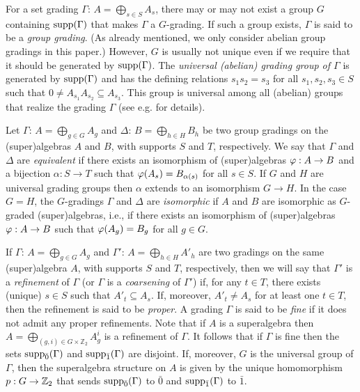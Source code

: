 For a set grading $\Gamma:\,A=\bigoplus_{s\in S}A_s$, there may or may not exist a group $G$ containing $\operatorname{supp}(\Gamma)$ that makes $\Gamma$ a $G$-grading. 
If such a group exists, $\Gamma$ is said to be a {\em group grading}. (As already mentioned, we only consider abelian group gradings in this paper.) 
However, $G$ is usually not unique even if we require that it should be generated by $\operatorname{supp}(\Gamma)$. 
The {\em universal (abelian) grading group of $\Gamma$} \cite{PZ} is generated by $\operatorname{supp}(\Gamma)$ and has the defining relations 
$s_1s_2=s_3$ for all $s_1,s_2,s_3\in S$ such that $0\neq A_{s_1}A_{s_2}\subseteq A_{s_3}$. 
This group is universal among all (abelian) groups that realize the grading $\Gamma$ (see e.g. \cite[Chapter 1]{livromicha} for details).

Let $\Gamma:\,A=\bigoplus_{g\in G} A_g$ and $\Delta:\,B=\bigoplus_{h\in H} B_h$ be two group gradings on the (super)algebras $A$ and $B$, with supports $S$ and $T$, respectively.
We say that $\Gamma$ and $\Delta$ are {\em equivalent} if there exists an isomorphism of (super)algebras $\varphi: A\to B$ and a bijection $\alpha: S\to T$ such that $\varphi(A_s)=B_{\alpha(s)}$ for all $s\in S$. If $G$ and $H$ are universal grading groups then $\alpha$ extends to an isomorphism $G\to H$. In the case $G=H$, the $G$-gradings $\Gamma$ and $\Delta$ are {\em isomorphic} if $A$ and $B$ are isomorphic as $G$-graded (super)algebras, i.e., if there exists an isomorphism of (super)algebras $\varphi: A\to B$ such that $\varphi(A_g)=B_g$ for all $g\in G$.

If $\Gamma:\,A=\bigoplus_{g\in G} A_g$ and $\Gamma':\,A=\bigoplus_{h\in H} A'_h$ are two gradings on the same (super)algebra $A$, with supports $S$ and $T$, respectively, then we will say that $\Gamma'$ is a {\em refinement} of $\Gamma$ (or $\Gamma$ is a {\em coarsening} of $\Gamma'$) if, for any $t\in T$, there exists (unique) $s\in S$ such that $A'_t\subseteq A_s$. If, moreover, $A'_t\ne A_s$ for at least one $t\in T$, then the refinement is said to be {\em proper}. A grading $\Gamma$ is said to be {\em fine} if it does not admit any proper refinements. 
Note that if $A$ is a superalgebra then $A=\bigoplus_{(g,i)\in G\times\mathbb{Z}_2}A_g^i$ is a refinement of $\Gamma$. 
It follows that if $\Gamma$ is fine then the sets $\operatorname{supp}_{\bar{0}}(\Gamma)$ and $\operatorname{supp}_{\bar{1}}(\Gamma)$ are disjoint. 
If, moreover, $G$ is the universal group of $\Gamma$, then the superalgebra structure on $A$ is given by the unique homomorphism $p: G \to \mathbb{Z}_2$ 
that sends $\operatorname{supp}_{\bar{0}}(\Gamma)$ to $\bar 0$ and $\operatorname{supp}_{\bar{1}}(\Gamma)$ to $\bar 1$.

